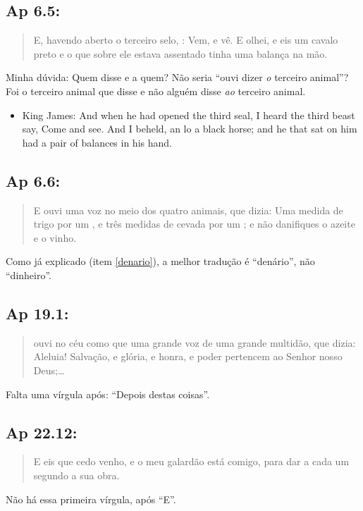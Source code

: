 \subsection*{Ap 6.5:}
\begin{quote}
    \small
E, havendo aberto o terceiro selo, : Vem, e vê. E olhei, e eis um cavalo preto e o que sobre ele estava assentado tinha uma balança na mão.
\end{quote}

Minha dúvida: Quem disse e a quem? Não seria ``ouvi dizer \emph{o} terceiro animal''? Foi o terceiro animal que disse e não alguém disse \emph{ao} terceiro animal.

\begin{itemize}
\item King James: And when he had opened the third seal, I heard the third beast say, Come and see. And I beheld, an lo a black horse; and he that sat on him had a pair of balances in his hand.
\end{itemize}

\subsection*{Ap 6.6:}
\begin{quote}
    \small
E ouvi uma voz no meio dos quatro animais, que dizia: Uma
medida de trigo por um , e três medidas de cevada por um ; e não danifiques o azeite e o vinho.
\end{quote}

Como já explicado (item \ref{denario}), a melhor tradução é ``denário'', não ``dinheiro''.

\subsection*{Ap 19.1:}
\begin{quote}
    \small
{} ouvi no céu como que uma grande voz de uma grande multidão, que dizia: Aleluia! Salvação, e glória, e honra, e poder pertencem ao Senhor nosso Deus;\ldots
\end{quote}

Falta uma vírgula após: ``Depois destas coisas''.


\subsection*{Ap 22.12:}
\begin{quote}
    \small
E\uwave{,} eis que cedo venho, e o meu galardão está comigo, para dar a cada um segundo a sua obra.
\end{quote}

Não há essa primeira vírgula, após ``E''.
